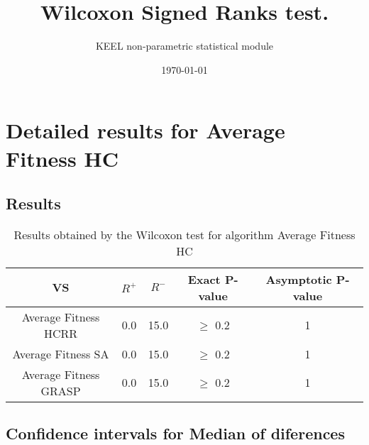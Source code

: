 \documentclass[a4paper,10pt]{article}
\title{Wilcoxon Signed Ranks test.}
\date{\today}
\author{KEEL non-parametric statistical module}
\begin{document}
\pagestyle{empty}
\maketitle
\thispagestyle{empty}



\section{Detailed results for Average Fitness HC}


\subsection{Results}

\begin{table}[!htp]
\centering\small
\begin{tabular}{
|c|c|c|c|c|}
\hline
 VS & $R^{+}$ & $R^{-}$ & Exact P-value & Asymptotic P-value \\ \hline 
Average Fitness HCRR & 0.0 & 15.0 & $\geq$ 0.2 & 1\\ \hline 
Average Fitness SA & 0.0 & 15.0 & $\geq$ 0.2 & 1\\ \hline 
Average Fitness GRASP & 0.0 & 15.0 & $\geq$ 0.2 & 1\\ \hline 

\end{tabular}
\caption{Results obtained by the Wilcoxon test for algorithm Average Fitness HC}
\end{table}

\subsection{Confidence intervals for Median of diferences}
\end{document}
